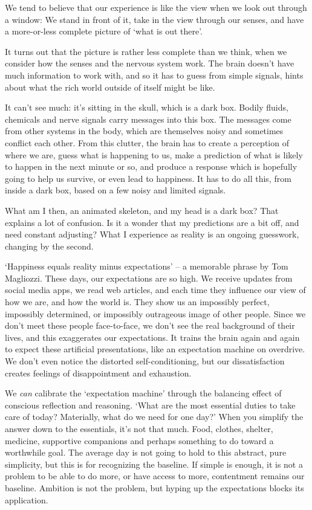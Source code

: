 We tend to believe that our experience is like the view when we look out
through a window: We stand in front of it, take in the view through our
senses, and have a more-or-less complete picture of `what is out there'.

It turns out that the picture is rather less complete than we think,
when we consider how the senses and the nervous system work. The brain
doesn't have much information to work with, and so it has to guess from
simple signals, hints about what the rich world outside of itself might
be like.

It can't see much: it's sitting in the skull, which is a dark box.
Bodily fluids, chemicals and nerve signals carry messages into this box.
The messages come from other systems in the body, which are themselves
noisy and sometimes conflict each other. From this clutter, the brain
has to create a perception of where we are, guess what is happening to
us, make a prediction of what is likely to happen in the next minute or
so, and produce a response which is hopefully going to help us survive,
or even lead to happiness. It has to do all this, from inside a dark
box, based on a few noisy and limited signals.

What am I then, an animated skeleton, and my head is a dark box? That
explains a lot of confusion. Is it a wonder that my predictions are a
bit off, and need constant adjusting? What I experience as reality is an
ongoing guesswork, changing by the second.

`Happiness equals reality minus expectations' -- a memorable phrase by
Tom Magliozzi. These days, our expectations are so high. We receive
updates from social media apps, we read web articles, and each time they
influence our view of how we are, and how the world is. They show us an
impossibly perfect, impossibly determined, or impossibly outrageous
image of other people. Since we don't meet these people face-to-face, we
don't see the real background of their lives, and this exaggerates our
expectations. It trains the brain again and again to expect these
artificial presentations, like an expectation machine on overdrive. We
don't even notice the distorted self-conditioning, but our
dissatisfaction creates feelings of disappointment and exhaustion.


We \emph{can} calibrate the `expectation machine' through the balancing
effect of conscious reflection and reasoning. `What are the most
essential duties to take care of today? Materially, what do we need for
one day?' When you simplify the answer down to the essentials, it's not
that much. Food, clothes, shelter, medicine, supportive companions and
perhaps something to do toward a worthwhile goal. The average day is not
going to hold to this abstract, pure simplicity, but this is for
recognizing the baseline. If simple is enough, it is not a problem to be
able to do more, or have access to more, contentment remains our
baseline. Ambition is not the problem, but hyping up the expectations
blocks its application.

